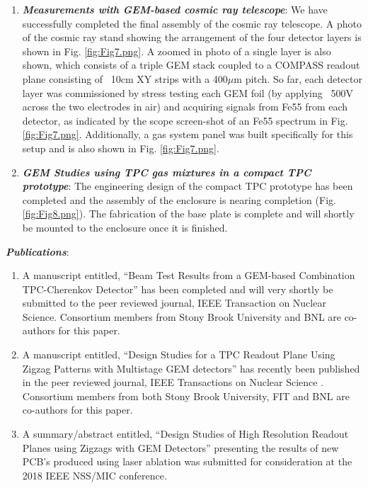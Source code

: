 \begin{enumerate}
\item	\textbf{\emph{Measurements with GEM-based cosmic ray telescope}}: We have successfully completed the final assembly of the cosmic ray telescope. A photo of the cosmic ray stand showing the arrangement of the four detector layers is shown in Fig. \ref{fig:Fig7.png}.  A zoomed in photo of a single layer is also shown, which consists of a triple GEM stack coupled to a COMPASS readout plane consisting of ~10cm XY strips with a 400$\mu$m pitch. So far, each detector layer was commissioned by stress testing each GEM foil (by applying ~500V across the two electrodes in air) and acquiring signals from Fe55 from each detector, as indicated by the scope screen-shot of an Fe55 spectrum in Fig. \ref{fig:Fig7.png}. Additionally, a gas system panel was built specifically for this setup and is also shown in Fig. \ref{fig:Fig7.png}. 

\item	\textbf{\emph{GEM Studies using TPC gas mixtures in a compact TPC prototype}}: The engineering design of the compact TPC prototype has been completed and the assembly of the enclosure is nearing completion (Fig. \ref{fig:Fig8.png}). The fabrication of the base plate is complete and will shortly be mounted to the enclosure once it is finished.   

\end{enumerate}


\textbf{\emph{Publications}}:
\begin{enumerate}

\item A manuscript entitled, “Beam Test Results from a GEM-based Combination TPC-Cherenkov Detector” has been completed and will very shortly be submitted to the peer reviewed journal, IEEE Transaction on Nuclear Science. Consortium members from Stony Brook University and BNL are co-authors for this paper.

\item A manuscript entitled, “Design Studies for a TPC Readout Plane Using Zigzag Patterns with Multistage GEM detectors” has recently been published in the peer reviewed journal, IEEE Transactions on Nuclear Science \cite{8379440}. Consortium members from both Stony Brook University, FIT and BNL are co-authors for this paper.

\item A summary/abstract entitled, “Design Studies of High Resolution Readout Planes using Zigzags with GEM Detectors” presenting the results of new PCB’s produced using laser ablation was submitted for consideration at the 2018 IEEE NSS/MIC conference. 

\end{enumerate}


